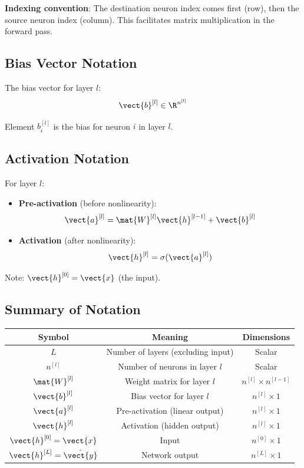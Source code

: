 \textbf{Indexing convention}: The destination neuron index comes first (row), then the source neuron index (column). This facilitates matrix multiplication in the forward pass.

\subsection{Bias Vector Notation}

\begin{definitionbox}
The bias vector for layer $l$:
\[
\vect{b}^{[l]} \in \R^{n^{[l]}}
\]

Element $b_i^{[l]}$ is the bias for neuron $i$ in layer $l$.
\end{definitionbox}

\subsection{Activation Notation}

\begin{definitionbox}
For layer $l$:
\begin{itemize}
    \item \textbf{Pre-activation} (before nonlinearity):
    \[
    \vect{a}^{[l]} = \mat{W}^{[l]} \vect{h}^{[l-1]} + \vect{b}^{[l]}
    \]
    
    \item \textbf{Activation} (after nonlinearity):
    \[
    \vect{h}^{[l]} = \sigma(\vect{a}^{[l]})
    \]
\end{itemize}

Note: $\vect{h}^{[0]} = \vect{x}$ (the input).
\end{definitionbox}

\subsection{Summary of Notation}

\begin{center}
\renewcommand{\arraystretch}{1.3}
\begin{tabular}{|c|c|c|}
\hline
\textbf{Symbol} & \textbf{Meaning} & \textbf{Dimensions} \\ \hline
$L$ & Number of layers (excluding input) & Scalar \\ \hline
$n^{[l]}$ & Number of neurons in layer $l$ & Scalar \\ \hline
$\mat{W}^{[l]}$ & Weight matrix for layer $l$ & $n^{[l]} \times n^{[l-1]}$ \\ \hline
$\vect{b}^{[l]}$ & Bias vector for layer $l$ & $n^{[l]} \times 1$ \\ \hline
$\vect{a}^{[l]}$ & Pre-activation (linear output) & $n^{[l]} \times 1$ \\ \hline
$\vect{h}^{[l]}$ & Activation (hidden output) & $n^{[l]} \times 1$ \\ \hline
$\vect{h}^{[0]} = \vect{x}$ & Input & $n^{[0]} \times 1$ \\ \hline
$\vect{h}^{[L]} = \hat{\vect{y}}$ & Network output & $n^{[L]} \times 1$ \\ \hline
\end{tabular}
\end{center}

